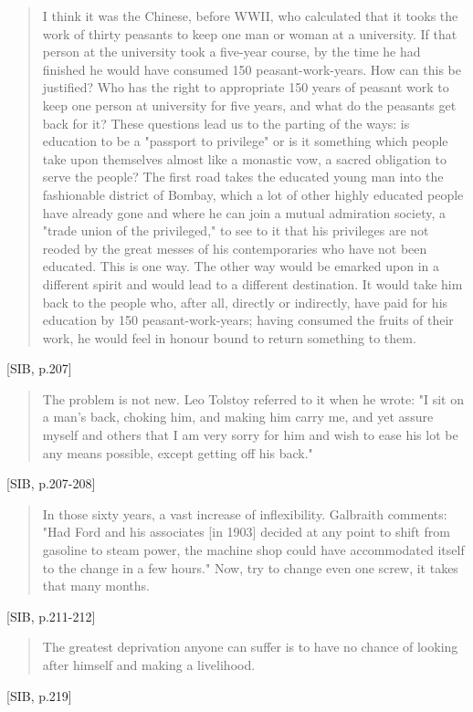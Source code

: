 \documentclass[letterpaper]{article}
\begin{document}
\begin{quote}
  I think it was the Chinese, before WWII, who calculated that it tooks the work of thirty peasants to keep one man or woman at a university. If that person at the university took a five-year course, by the time he had finished he would have consumed 150 peasant-work-years. How can this be justified? Who has the right to appropriate 150 years of peasant work to keep one person at university for five years, and what do the peasants get back for it? These questions lead us to the parting of the ways: is education to be a "passport to privilege" or is it something which people take upon themselves almost like a monastic vow, a sacred obligation to serve the people? The first road takes the educated young man into the fashionable district of Bombay, which a lot of other highly educated people have already gone and where he can join a mutual admiration society, a "trade union of the privileged," to see to it that his privileges are not reoded by the great messes of his contemporaries who have not been educated. This is one way. The other way would be emarked upon in a different spirit and would lead to a different destination. It would take him back to the people who, after all, directly or indirectly, have paid for his education by 150 peasant-work-years; having consumed the fruits of their work, he would feel in honour bound to return something to them.
\end{quote}[SIB, p.207]

\begin{quote}
  The problem is not new. Leo Tolstoy referred to it when he wrote: "I sit on a man's back, choking him, and making him carry me, and yet assure myself and others that I am very sorry for him and wish to ease his lot be any means possible, except getting off his back."
\end{quote}[SIB, p.207-208]

\begin{quote}
  In those sixty years, a vast increase of inflexibility. Galbraith comments: "Had Ford and his associates [in 1903] decided at any point to shift from gasoline to steam power, the machine shop could have accommodated itself to the change in a few hours." Now, try to change even one screw, it takes that many months.
\end{quote}[SIB, p.211-212]

\begin{quote}
  The greatest deprivation anyone can suffer is to have no chance of looking after himself and making a livelihood.
\end{quote}[SIB, p.219]
\end{document}
